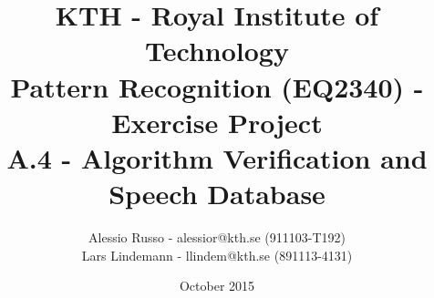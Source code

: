 \documentclass[10pt,a4paper,final]{article}
\author{Alessio Russo - alessior@kth.se (911103-T192) \\ Lars Lindemann - llindem@kth.se (891113-4131)}
\title{KTH - Royal Institute of Technology \\ \Large{Pattern Recognition (EQ2340) - Exercise Project }\\ A.4 - Algorithm Verification and Speech Database}
\date{October 2015}
\begin{document}
\maketitle
\tableofcontents


\clearpage

\newpage
\\
\newpage

\end{document}
